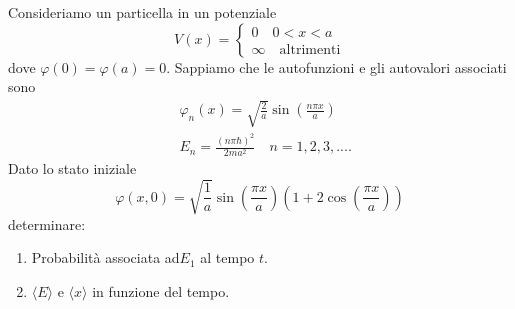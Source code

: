 Consideriamo un particella in un potenziale 
\begin{equation*}
	V(x) = \left \{ \begin{array}{l}
		0 \quad 0 < x < a \\
		\infty  \quad \text{altrimenti}
	\end{array} \right.
\end{equation*}
dove $\varphi(0) = \varphi(a) = 0$. Sappiamo che le autofunzioni e gli autovalori associati sono 
\begin{align*}
	&\varphi_n(x) =\sqrt{\frac{2}{a}}\sin \left( \frac{n \pi x}{a}\right) \\[0.5cm]
	& E_n =  \frac{(n \pi \hbar)^2}{2ma^2} \quad n=1,2,3,....
\end{align*}
Dato lo stato iniziale 
\begin{equation*}
	\varphi(x,0) = \sqrt{\frac{1}{a}} \sin\left( \frac{\pi x}{a}\right )\left( 1 + 2 \cos \left( \frac{\pi x}{a}\right)\right)
\end{equation*}
determinare: 
\newpage

\begin{enumerate}
	\item Probabilit\`a associata ad$ E_1$ al tempo $t$.
	\item $\langle E \rangle $ e $\langle x \rangle $ in funzione del tempo.
\end{enumerate}

